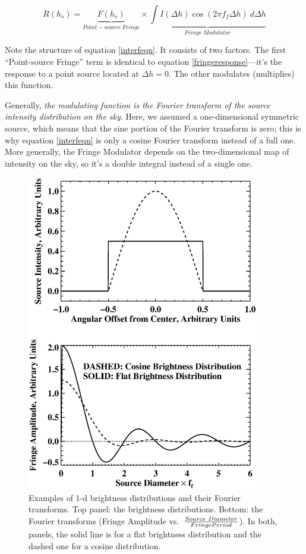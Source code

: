 \documentclass[11pt,preprint]{aastex}
\begin{document}
\begin{equation} \label{interfeqn}
R(h_s) = \underbrace{ F(h_s)}_{Point-source\ 
Fringe} \times 
\underbrace{\int I(\Delta h) \cos( 2\pi f_f \Delta h) \  d \Delta h}_{Fringe \ Modulator} 
\end{equation}

\noindent Note the structure of equation \ref{interfeqn}. It consists of
two factors. The first ``Point-source Fringe'' term is identical to equation
\ref{fringeresponse}---it's the response to a point source located at
$\Delta h=0$. The other modulates (multiplies) this function. 

Generally, {\it the modulating function is the Fourier transform of the
  source intensity distribution on the sky}.  Here, we assumed a
one-dimensional symmetric source, which means that the sine portion of
the Fourier transform is zero; this is why equation \ref{interfeqn} is
only a cosine Fourier transform instead of a full one.  More generally,
the Fringe Modulator depends on the two-dimensional map of intensity on
the sky, so it's a double integral instead of a single one.  
  
\begin{figure}[h!]
\begin{center}
\includegraphics[width=4.0in] {cosfringe.ps}
\end{center}
                                                                                
\caption{Examples of 1-d brightness distributions and their Fourier
  transforms. Top panel: the brightness distributions. Bottom: the Fourier
  transforms (Fringe Amplitude vs.\ ${Source\ Diameter \over Fringe
    Period}$). In both, panels, the solid line is for a flat brightness
  distribution and the dashed one for a cosine distribution.
\label{cosfringe} } \end{figure}
\end{document}
